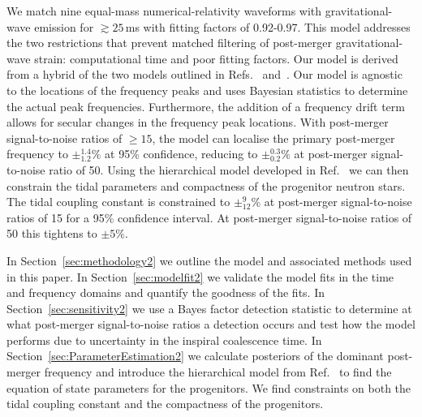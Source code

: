 \documentclass[../Thesis.tex]{subfiles}
\begin{document}
    We match nine equal-mass numerical-relativity waveforms with gravitational-wave emission for $\gtrsim 25$\,ms with fitting factors of 0.92-0.97.
    This model addresses the two restrictions that prevent matched filtering of post-merger gravitational-wave strain: computational time and poor fitting factors.
    Our model is derived from a hybrid of the two models outlined in Refs.~\cite{Bauswein2016} and~\cite{Bose2018}. 
    Our model is agnostic to the locations of the frequency peaks and uses Bayesian statistics to determine the actual peak frequencies.
    Furthermore, the addition of a frequency drift term allows for secular changes in the frequency peak locations.
    With post-merger signal-to-noise ratios of $\ge 15$, the model can localise the primary post-merger frequency to $\pm_{1.2}^{1.4}\%$ at 95\% confidence, reducing to $\pm_{0.2}^{0.3}\%$ at post-merger signal-to-noise ratio of 50.
    Using the hierarchical model developed in Ref.~\cite{Easter2019} we can then constrain the tidal parameters and compactness of the progenitor neutron stars.
    The tidal coupling constant is constrained to $\pm_{12}^{9}\%$ at post-merger signal-to-noise ratios of 15 for a 95\% confidence interval. 
    At post-merger signal-to-noise ratios of 50 this tightens to $\pm 5 \%$. \par
    
    In Section~\ref{sec:methodology2} we outline the model and associated methods used in this paper. 
    In Section~\ref{sec:modelfit2} we validate the model fits in the time and frequency domains and quantify the goodness of the fits.
    In Section~\ref{sec:sensitivity2} we use a Bayes factor detection statistic to determine at what post-merger signal-to-noise ratios a detection occurs and test how the model performs due to uncertainty in the inspiral coalescence time.
    In Section~\ref{sec:ParameterEstimation2} we calculate posteriors of the dominant post-merger frequency and introduce the hierarchical model from Ref.~\cite{Easter2019} to find the equation of state parameters for the progenitors.
    We find constraints on both the tidal coupling constant and the compactness of the progenitors.
\end{document}
